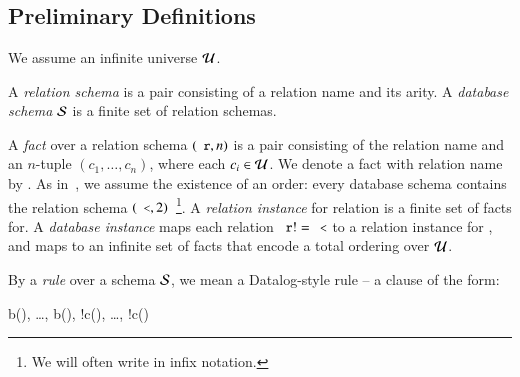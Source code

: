 \section{\large \bf \lang}
\label{sec:foundation}

\subsection{Preliminary Definitions}


We assume an infinite universe $\univ$.

A {\em relation schema} is a pair consisting of a relation name and its arity.
A {\em database schema} $\schema$ is a finite set of relation schemas.

A {\em fact} over a relation schema $(\dedalus{r}, n)$ is a pair consisting of the
relation name  and an $n$-tuple $(c_1,\ldots,c_n)$, where each $c_i \in \univ$.  We denote a fact with relation name  by .  As in~\cite{immerman-ptime}, we assume the existence of an order: every database schema contains the relation schema $(\dedalus{<},2)$~\footnote{We will often write \dedalus{<} in infix notation.}.  A {\em relation instance} for relation  is a finite set of facts for.  A {\em database instance} maps each relation $\dedalus{r} != \dedalus{<}$ to a relation instance for , and maps \dedalus{<} to an infinite set of \dedalus{<} facts that encode a total ordering over $\univ$.

By a {\em rule} over a schema $\schema$, we mean a Datalog-style rule -- a clause of the form:

\begin{Drules}
        {b(), \ldots, b(), !c(), \ldots, !c()}
\end{Drules}

